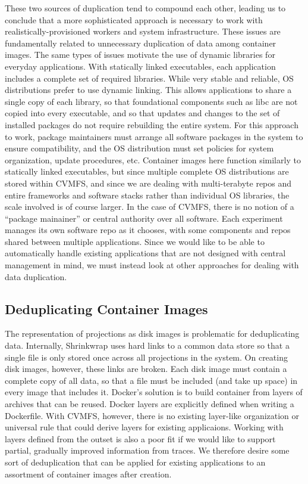 \documentclass[sigconf]{acmart}
\begin{document}
These two sources of duplication tend to compound each other,
leading us to conclude that a more sophisticated approach is necessary to work with realistically-provisioned workers and system infrastructure.
These issues are fundamentally related to unnecessary duplication of data among container images.
The same types of issues motivate the use of dynamic libraries for everyday applications.
With statically linked executables,
each application includes a complete set of required libraries.
While very stable and reliable,
OS distributions prefer to use dynamic linking.
This allows applications to share a single copy of each library,
so that foundational components such as libc are not copied into every executable,
and so that updates and changes to the set of installed packages do not require rebuilding the entire system.
For this approach to work,
package maintainers must arrange all software packages in the system to ensure compatibility,
and the OS distribution must set policies for system organization, update procedures, etc.
Container images here function similarly to statically linked executables,
but since multiple complete OS distributions are stored within CVMFS,
and since we are dealing with multi-terabyte repos and entire frameworks and software stacks rather than individual OS libraries,
the scale involved is of course larger.
In the case of CVMFS, there is no notion of a ``package mainainer'' or central authority over all software.
Each experiment manages its own software repo as it chooses,
with some components and repos shared between multiple applications.
Since we would like to be able to automatically handle existing applications that are not designed with central management in mind,
we must instead look at other approaches for dealing with data duplication.

\subsection{Deduplicating Container Images}

The representation of projections as disk images is problematic for deduplicating data.
Internally, Shrinkwrap uses hard links to a common data store so that a single file is only stored once across all projections in the system.
On creating disk images, however,
these links are broken.
Each disk image must contain a complete copy of all data,
so that a file must be included (and take up space) in every image that includes it.
Docker's solution is to build container from layers of archives that can be reused.
Docker layers are explicitly defined when writing a Dockerfile.
With CVMFS, however, there is no existing layer-like organization or universal rule that could derive layers for existing applicaions.
Working with layers defined from the outset is also a poor fit if we would like to support partial, gradually improved information from traces.
We therefore desire some sort of deduplication that can be applied for existing applications to an assortment of container images after creation.
\end{document}
